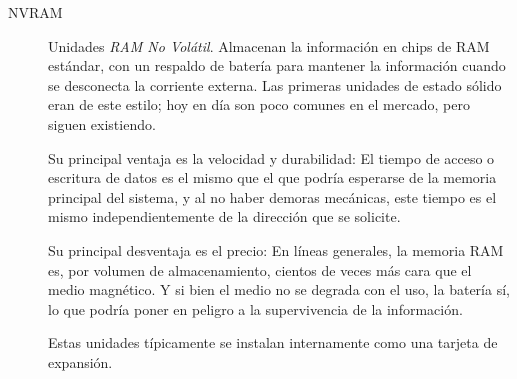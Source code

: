 \documentclass[11pt,fleqn]{book} %
\begin{document}
\begin{description}
\item[NVRAM] Unidades \emph{RAM No Volátil}. Almacenan la información en
           chips de RAM estándar, con un respaldo de batería para
           mantener la información cuando se desconecta la corriente
           externa. Las primeras unidades de estado sólido eran de
           este estilo; hoy en día son poco comunes en el mercado,
           pero siguen existiendo.

	   Su principal ventaja es la velocidad y durabilidad: El
           tiempo de acceso o escritura de datos es el mismo que el
           que podría esperarse de la memoria principal del sistema, y
           al no haber demoras mecánicas, este tiempo es el mismo
           independientemente de la dirección que se solicite.

	   Su principal desventaja es el precio: En líneas generales,
           la memoria RAM es, por volumen de almacenamiento, cientos
           de veces más cara que el medio magnético. Y si bien el
           medio no se degrada con el uso, la batería sí, lo que
           podría poner en peligro a la supervivencia de la
           información.

	   Estas unidades típicamente se instalan internamente como
           una tarjeta de expansión.


\end{description}
\end{document}
